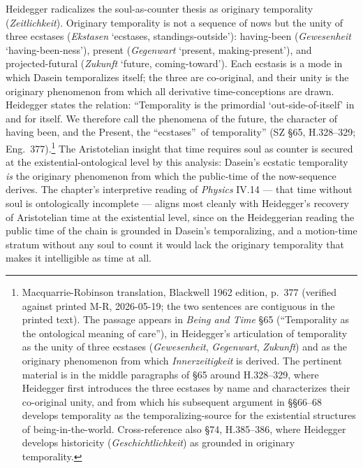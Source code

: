 Heidegger radicalizes the soul-as-counter thesis as originary temporality (\textit{Zeitlichkeit}). Originary temporality is not a sequence of nows but the unity of three ecstases (\textit{Ekstasen} `ecstases, standings-outside'): having-been (\textit{Gewesenheit} `having-been-ness'), present (\textit{Gegenwart} `present, making-present'), and projected-futural (\textit{Zukunft} `future, coming-toward'). Each ecstasis is a mode in which Dasein temporalizes itself; the three are co-original, and their unity is the originary phenomenon from which all derivative time-conceptions are drawn. Heidegger states the relation: ``Temporality is the primordial `out-side-of-itself' in and for itself. We therefore call the phenomena of the future, the character of having been, and the Present, the \textquotedblleft ecstases\textquotedblright\ of temporality'' (SZ \S 65, H.328--329; Eng.~377).\footnote{Macquarrie-Robinson translation, Blackwell 1962 edition, p.~377 (verified against printed M-R, 2026-05-19; the two sentences are contiguous in the printed text). The passage appears in \textit{Being and Time} \S 65 (``Temporality as the ontological meaning of care''), in Heidegger's articulation of temporality as the unity of three ecstases (\textit{Gewesenheit}, \textit{Gegenwart}, \textit{Zukunft}) and as the originary phenomenon from which \textit{Innerzeitigkeit} is derived. The pertinent material is in the middle paragraphs of \S 65 around H.328--329, where Heidegger first introduces the three ecstases by name and characterizes their co-original unity, and from which his subsequent argument in \S\S 66--68 develops temporality as the temporalizing-source for the existential structures of being-in-the-world. Cross-reference also \S 74, H.385--386, where Heidegger develops historicity (\textit{Geschichtlichkeit}) as grounded in originary temporality.} The Aristotelian insight that time requires soul as counter is secured at the existential-ontological level by this analysis: Dasein's ecstatic temporality \textit{is} the originary phenomenon from which the public-time of the now-sequence derives. The chapter's interpretive reading of \textit{Physics} IV.14 --- that time without soul is ontologically incomplete --- aligns most cleanly with Heidegger's recovery of Aristotelian time at the existential level, since on the Heideggerian reading the public time of the chain is grounded in Dasein's temporalizing, and a motion-time stratum without any soul to count it would lack the originary temporality that makes it intelligible as time at all.

